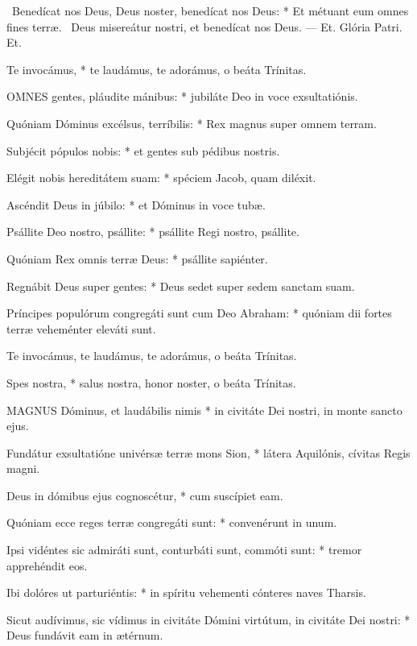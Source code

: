 \R\ Benedícat nos Deus, Deus noster, benedícat nos Deus: * Et métuant eum omnes fines terræ. \V\ Deus misereátur nostri, et benedícat nos Deus. --- Et. Glória Patri. Et.


 Te invocámus, * te laudámus, te adorámus, o beáta Trínitas.


\lettrine[lines=2]{O}{MNES} gentes, pláudite mánibus: * jubiláte Deo in voce exsultatiónis.

Quóniam Dóminus excélsus, terríbilis: * Rex magnus super omnem terram.

Subjécit pópulos nobis: * et gentes sub pédibus nostris.

Elégit nobis hereditátem suam: * spéciem Jacob, quam diléxit.

Ascéndit Deus in júbilo: * et Dóminus in voce tubæ.

Psállite Deo nostro, psállite: * psállite Regi nostro, psállite.

Quóniam Rex omnis terræ Deus: * psállite sapiénter.

Regnábit Deus super gentes: * Deus sedet super sedem sanctam suam.

Príncipes populórum congregáti sunt cum Deo Abraham: * quóniam dii fortes terræ veheménter eleváti sunt.

 Te invocámus, te laudámus, te adorámus, o beáta Trínitas.

 Spes nostra, * salus nostra, honor noster, o beáta Trínitas.


\lettrine[lines=2]{M}{AGNUS} Dóminus, et laudábilis nimis * in civitáte Dei nostri, in monte sancto ejus.

Fundátur exsultatióne univérsæ terræ mons Sion, * látera Aquilónis, cívitas Regis magni.

Deus in dómibus ejus cognoscétur, * cum suscípiet eam.

Quóniam ecce reges terræ congregáti sunt: * convenérunt in unum.

Ipsi vidéntes sic admiráti sunt, conturbáti sunt, commóti sunt: * tremor apprehéndit eos.

Ibi dolóres ut parturiéntis: * in spíritu vehementi cónteres naves Tharsis.

Sicut audívimus, sic vídimus in civitáte Dómini virtútum, in civitáte Dei nostri: * Deus fundávit eam in ætérnum.

